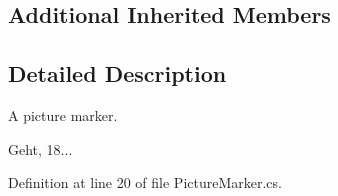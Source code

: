 \subsection*{Additional Inherited Members}


\subsection{Detailed Description}
A picture marker. 

Geht, 18... 

Definition at line 20 of file Picture\-Marker.\-cs.

